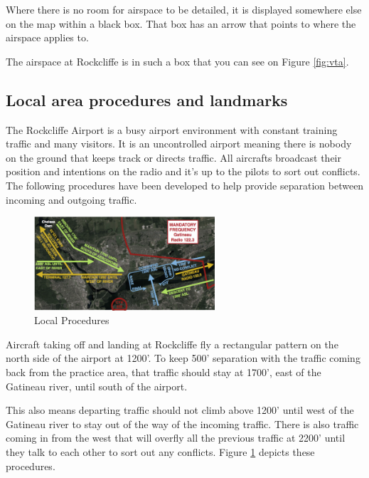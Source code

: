 \documentclass[12pt,letterpaper]{article}
\begin{document}
        Where there is no room for airspace to be detailed, it is displayed somewhere else on the map within a black box. That box has an arrow that points to where the airspace applies to.
        
        The airspace at Rockcliffe is in such a box that you can see on Figure \ref{fig:vta}.
        
        \subsection{Local area procedures and landmarks}
        \label{subsection:localprocs}
        
        The Rockcliffe Airport is a busy airport environment with constant training traffic and many visitors. It is an uncontrolled airport meaning there is nobody on the ground that keeps track or directs traffic. All aircrafts broadcast their position and intentions on the radio and it's up to the pilots to sort out conflicts. The following procedures have been developed to help provide separation between incoming and outgoing traffic.
        
        \begin{figure}
          \begin{center}
            \includegraphics[width=0.6\textwidth]{cyro-local.png}
          \end{center}
          \caption{Local Procedures}
          \label{fig:local-procedures}
        \end{figure}

        Aircraft taking off and landing at Rockcliffe fly a rectangular pattern on the north side of the airport at 1200'. To keep 500' separation with the traffic coming back from the practice area, that traffic should stay at 1700', east of the Gatineau river, until south of the airport.
        
        This also means departing traffic should not climb above 1200' until west of the Gatineau river to stay out of the way of the incoming traffic. There is also traffic coming in from the west that will overfly all the previous traffic at 2200' until they talk to each other to sort out any conflicts. Figure \ref{fig:local-procedures} depicts these procedures.
        
\end{document}
